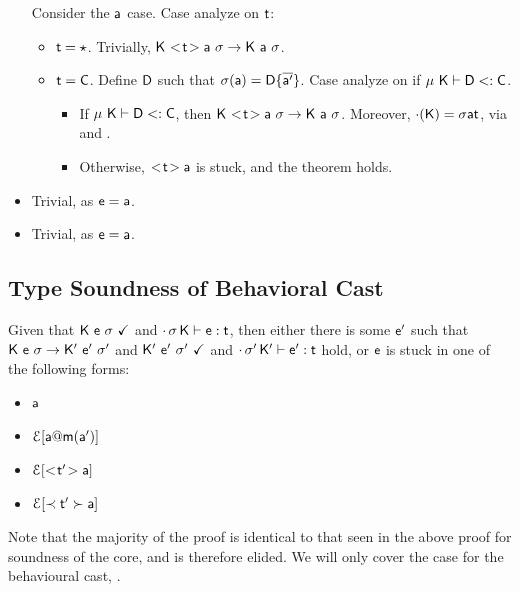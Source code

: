 \documentclass[a4paper,USenglish]{tex/lipics-v2016}
\begin{document}
\begin{itemize}
      Consider the ${\sf{a}}$ case. Case analyze on $\t$:
      \begin{itemize}
        \item $\t = \any$. Trivially, $\Reduce\K{\SubCast\t\a}\s \K\a\s$.
        \item $\t = \C$. Define ${\sf{D}}$ such that $\sigma({\sf{a}}) = {\sf{D}}\{\overline{{\sf{a}}'}\}$. Case analyze on if $\mu~{\sf{K}}\vdash {\sf{D}}<: {\sf{C}}$.
        \begin{itemize}
          \item If $\mu~{\sf{K}}\vdash {\sf{D}}<: {\sf{C}}$, then $\Reduce\K{\SubCast\t\a}\s \K\a\s$. Moreover, $\HasType\cdot\K\s\a\t$, via  and .
          \item Otherwise, $\SubCast\t\a$ is stuck, and the theorem holds.
        \end{itemize}
      \end{itemize}
  
  \item {}
  
      Trivial, as ${\sf{e}}={\sf{a}}$.
  
  \item {}
  
      Trivial, as ${\sf{e}}={\sf{a}}$.

  
\end{itemize}


\subsection{Type Soundness of \kafka Behavioral Cast}

Given that ${\sf{K}}~{\sf{e}}~\sigma~\checkmark$ and $\EnvType\cdot\s\K\e\t$, then either there is some ${{{\sf{e'}}}}$ 
such that ${{\sf{K}}}~{{\sf{e}}}~{\sigma} \rightarrow {{\ensuremath{{\sf{K'}}}}}~{{{{\sf{e'}}}}}~{{{\sigma'}}}$ and ${{\sf{K'}}}~{{{\sf{e'}}}}~{{\sigma'}}~\checkmark$ and $\EnvType\cdot\sp\Kp\ep\t$ hold, 
or ${\sf{e}}$ is stuck in one of the following forms:
\begin{itemize} 
\item ${\sf{a}}$
\item $\EE[\DynCall\a\m{\ap}]$
\item $\EE[\SubCast\tp\a]$
\item $\EE[\ShaCast\tp\a]$
\end{itemize}

Note that the majority of the proof is identical to that seen in the above proof
for soundness of the \kafka core, and is therefore elided. We will only cover
the case for the \kafka behavioural cast, .
\end{document}
